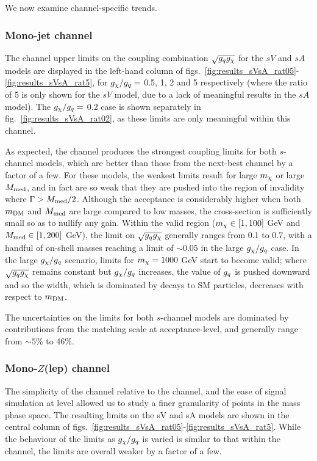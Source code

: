 We now examine channel-specific trends.

\subsubsection{Mono-jet channel}

The \monojet channel upper limits on the coupling combination $\sqrt{g_q g_{\chi}}$ for the $sV$ and $sA$ models are displayed in the left-hand column of figs.~\ref{fig:results_sVsA_rat05}-\ref{fig:results_sVsA_rat5}, for $g_{\chi}/g_q =$ 0.5, 1, 2 and 5 respectively (where the ratio of 5 is only shown for the $sV$ model, due to a lack of meaningful results in the $sA$ model). The $g_{\chi}/g_q =$ 0.2 case is shown separately in fig.~\ref{fig:results_sVsA_rat02}, as these limits are only meaningful within this channel.

As expected, the \monojet channel produces the strongest coupling limits for both $s$-channel models, which are better than those from the next-best \monoZ channel by a factor of a few. For these models, the weakest limits result for large $m_{\chi}$ or large $M_{\mathrm{med}}$, and in fact are so weak that they are pushed into the region of invalidity where $\Gamma > M_{\mathrm{med}}/2$. Although the acceptance is considerably higher when both $m_{\mathrm{DM}}$ and $M_{\mathrm{med}}$ are large compared to low masses, the cross-section is sufficiently small so as to nullify any gain. Within the valid region ($m_{\chi} \in [1, 100]$ GeV and $M_{\mathrm{med}} \in [1, 200]$ GeV), the limit on $\sqrt{g_q g_{\chi}}$ generally ranges from 0.1 to 0.7, with a handful of on-shell masses reaching a limit of $\sim$0.05 in the large $g_{\chi} / g_q$ case. In the large $g_{\chi}/g_q$ scenario, limits for $m_{\chi} = 1000$ GeV start to become valid; where $\sqrt{g_q g_{\chi}}$ remains constant but $g_{\chi} / g_q$ increases, the value of $g_q$ is pushed downward and so the width, which is dominated by decays to SM particles, decreases with respect to $m_{\mathrm{DM}}$.

The uncertainties on the limits for both $s$-channel models are dominated by contributions from the matching scale at acceptance-level, and generally range from $\sim5$\% to 46\%.

\subsubsection{Mono-$Z$(lep) channel}

The simplicity of the \monoZ channel relative to the \monojet channel, and the ease of signal simulation at \MG level allowed us to study a finer granularity of points in the mass phase space. The resulting limits on the sV and sA models are shown in the central column of figs.~\ref{fig:results_sVsA_rat05}-\ref{fig:results_sVsA_rat5}. While the behaviour of the limits as $g_{\chi} / g_q$ is varied is similar to that within the \monojet channel, the \monoZ limits are overall weaker by a factor of a few.

